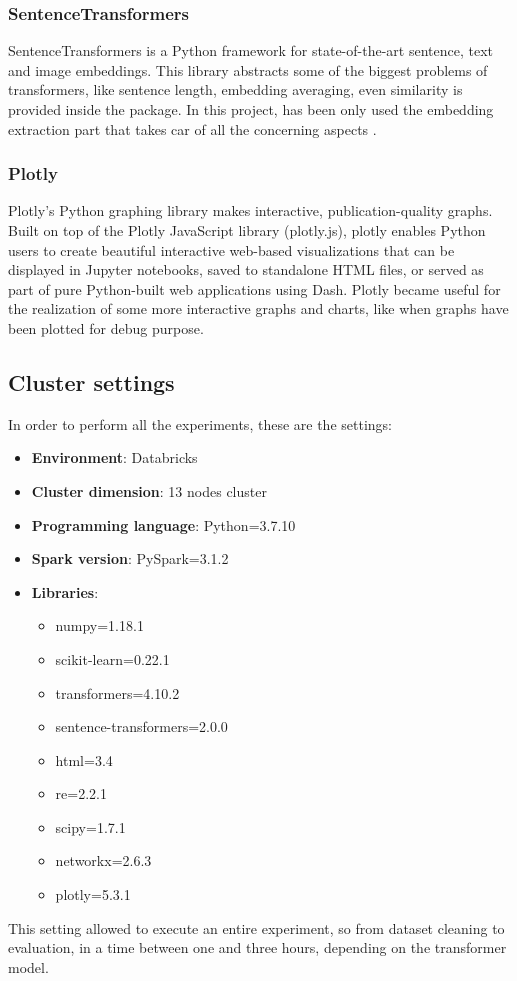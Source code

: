 \documentclass[\main/main.tex]{subfiles}
\begin{document}
\subsubsection{SentenceTransformers}
SentenceTransformers is a Python framework for state-of-the-art sentence, text and image embeddings. This library abstracts some of the biggest problems of transformers, like sentence length, embedding averaging, even similarity is provided inside the package. In this project, has been only used the embedding extraction part that takes car of all the concerning aspects \cite{sentence-transformers}.
\subsubsection{Plotly}
Plotly's \cite{plotly} Python graphing library makes interactive, publication-quality graphs. Built on top of the Plotly JavaScript library (plotly.js), plotly enables Python users to create beautiful interactive web-based visualizations that can be displayed in Jupyter notebooks, saved to standalone HTML files, or served as part of pure Python-built web applications using Dash. Plotly became useful for the realization of some more interactive graphs and charts, like when graphs have been plotted for debug purpose.
\subsection{Cluster settings}
In order to perform all the experiments, these are the settings:
\begin{itemize}
    \item \textbf{Environment}: Databricks
    \item \textbf{Cluster dimension}: 13 nodes cluster
    \item \textbf{Programming language}: Python=3.7.10
    \item \textbf{Spark version}: PySpark=3.1.2
    \item \textbf{Libraries}: 
        \begin{itemize}
            \item numpy=1.18.1
            \item scikit-learn=0.22.1
            \item transformers=4.10.2
            \item sentence-transformers=2.0.0
            \item html=3.4
            \item re=2.2.1
            \item scipy=1.7.1
            \item networkx=2.6.3
            \item plotly=5.3.1
        \end{itemize}
\end{itemize}
This setting allowed to execute an entire experiment, so from dataset cleaning to evaluation, in a time between one and three hours, depending on the transformer model.
\end{document}
